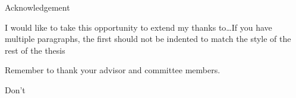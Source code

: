 \newpage
\thispagestyle{plain}
\setlength{\parindent}{0em}
\begin{center}
{\huge Acknowledgement}
\end{center}

I would like to take this opportunity to extend my thanks to\ldots If you have multiple paragraphs, the first should not be indented to match the style of the rest of the thesis

\setlength{\parindent}{2em}
Remember to thank your advisor and committee members.

Don\rq{}t 